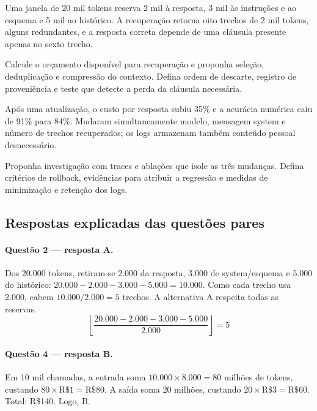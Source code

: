
\TextoBase

Uma janela de 20 mil tokens reserva 2 mil à resposta, 3 mil às instruções e ao esquema e 5 mil ao histórico. A recuperação retorna oito trechos de 2 mil tokens, alguns redundantes, e a resposta correta depende de uma cláusula presente apenas no sexto trecho.

\FonteDidatica

\Comando Calcule o orçamento disponível para recuperação e proponha seleção, deduplicação e compressão do contexto. Defina ordem de descarte, registro de proveniência e teste que detecte a perda da cláusula necessária.


\TextoBase

Após uma atualização, o custo por resposta subiu 35\% e a acurácia numérica caiu de 91\% para 84\%. Mudaram simultaneamente modelo, mensagem system e número de trechos recuperados; os logs armazenam também conteúdo pessoal desnecessário.

\FonteDidatica

\Comando Proponha investigação com traces e ablações que isole as três mudanças. Defina critérios de rollback, evidências para atribuir a regressão e medidas de minimização e retenção dos logs.

\newpage

\subsection{Respostas explicadas das questões pares}

\paragraph{Questão 2 --- resposta A.} Dos 20.000 tokens, retiram-se 2.000 da resposta, 3.000 de system/esquema e 5.000 do histórico: $20.000-2.000-3.000-5.000=10.000$. Como cada trecho usa 2.000, cabem $10.000/2.000=5$ trechos. A alternativa A respeita todas as reservas.
\[\left\lfloor\frac{20.000-2.000-3.000-5.000}{2.000}\right\rfloor=5\]

\paragraph{Questão 4 --- resposta B.} Em 10 mil chamadas, a entrada soma $10.000\times8.000=80$ milhões de tokens, custando $80\times\text{R\$}1=\text{R\$}80$. A saída soma 20 milhões, custando $20\times\text{R\$}3=\text{R\$}60$. Total: R\$140. Logo, B.

